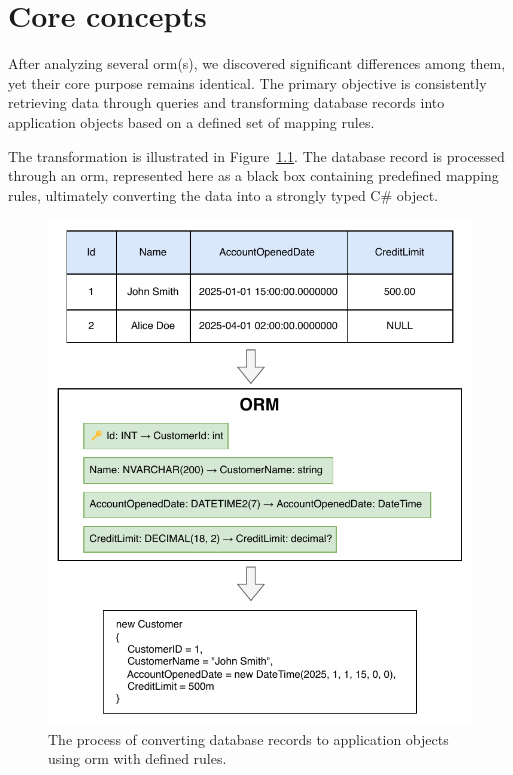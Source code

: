 \chapter{Core concepts}

After analyzing several \acrshort{orm}(s), we discovered significant differences among them, yet their core purpose remains identical. The primary objective is consistently retrieving data through queries and transforming database records into application objects based on a defined set of mapping rules.

The transformation is illustrated in Figure~\ref{fig:db_to_orm}. The database record is processed through an \acrshort{orm}, represented here as a black box containing predefined mapping rules, ultimately converting the data into a strongly typed C\# object.


\begin{figure}[h]
  \centering
  \includegraphics[scale=1.0]{thesis/img/thesis/03_orm_transformation.drawio.pdf}
  \caption{The process of converting database records to application objects using \acrshort{orm} with defined rules.}
  \label{fig:db_to_orm}
\end{figure}

